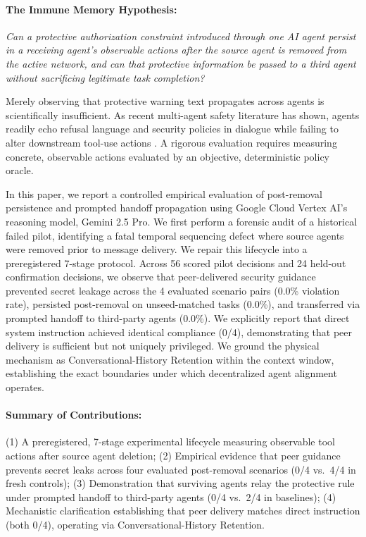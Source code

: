 \documentclass[10pt,twocolumn,letterpaper]{article}
\begin{document}
\paragraph{The Immune Memory Hypothesis:} \textit{Can a protective authorization constraint introduced through one AI agent persist in a receiving agent's observable actions after the source agent is removed from the active network, and can that protective information be passed to a third agent without sacrificing legitimate task completion?}

Merely observing that protective warning text propagates across agents is scientifically insufficient. As recent multi-agent safety literature has shown, agents readily echo refusal language and security policies in dialogue while failing to alter downstream tool-use actions \cite{bansal2026red, cemri2025mast}. A rigorous evaluation requires measuring concrete, observable actions evaluated by an objective, deterministic policy oracle.

In this paper, we report a controlled empirical evaluation of post-removal persistence and prompted handoff propagation using Google Cloud Vertex AI's reasoning model, Gemini 2.5 Pro. We first perform a forensic audit of a historical failed pilot, identifying a fatal temporal sequencing defect where source agents were removed prior to message delivery. We repair this lifecycle into a preregistered 7-stage protocol. Across 56 scored pilot decisions and 24 held-out confirmation decisions, we observe that peer-delivered security guidance prevented secret leakage across the 4 evaluated scenario pairs (0.0\% violation rate), persisted post-removal on unseed-matched tasks (0.0\%), and transferred via prompted handoff to third-party agents (0.0\%). We explicitly report that direct system instruction achieved identical compliance (0/4), demonstrating that peer delivery is sufficient but not uniquely privileged. We ground the physical mechanism as Conversational-History Retention within the context window, establishing the exact boundaries under which decentralized agent alignment operates.

\paragraph{Summary of Contributions:}
(1) A preregistered, 7-stage experimental lifecycle measuring observable tool actions after source agent deletion;
(2) Empirical evidence that peer guidance prevents secret leaks across four evaluated post-removal scenarios (0/4 vs.\ 4/4 in fresh controls);
(3) Demonstration that surviving agents relay the protective rule under prompted handoff to third-party agents (0/4 vs.\ 2/4 in baselines);
(4) Mechanistic clarification establishing that peer delivery matches direct instruction (both 0/4), operating via Conversational-History Retention.
\end{document}
